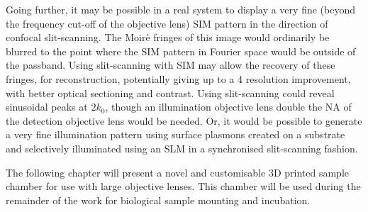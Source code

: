 Going further, it may be possible in a real system to display a very fine (beyond the frequency cut-off of the objective lens) \gls{SIM} pattern in the direction of confocal \gls{slit-scanning}.
The Moirè fringes of this image would ordinarily be blurred to the point where the \gls{SIM} pattern in Fourier space would be outside of the passband.
Using \gls{slit-scanning} with \gls{SIM} may allow the recovery of these fringes, for reconstruction, potentially giving up to a \SI{4}{\times} resolution improvement, with better optical sectioning and contrast.
Using slit-scanning could reveal sinusoidal peaks at \(2k_0 \), though an illumination objective lens double the \gls{NA} of the detection objective lens would be needed.
Or, it would be possible to generate a very fine illumination pattern using surface plasmons created on a substrate~\cite{weiPlasmonicStructuredIllumination2010} and selectively illuminated using an \gls{SLM} in a synchronised slit-scanning fashion.

The following chapter will present a novel and customisable 3D printed sample chamber for use with large objective lenses.
This chamber will be used during the remainder of the work for biological sample mounting and incubation.






